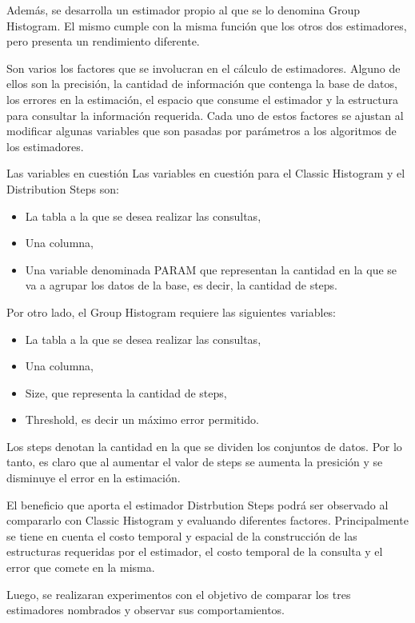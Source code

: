 \documentclass[10pt, a4paper,english,spanish,hidelinks]{article}
\begin{document}
Además, se desarrolla un estimador propio al que se lo denomina Group Histogram. El mismo cumple con la misma función que los otros dos estimadores, pero presenta un rendimiento diferente. 

Son varios los factores que se involucran en el cálculo de estimadores. Alguno de ellos
son la precisión, la cantidad de información que contenga la base de datos, los errores
en la estimación, el espacio que consume el estimador y la estructura para consultar la
información requerida. Cada uno de estos factores se ajustan al modificar algunas variables
que son pasadas por parámetros a los algoritmos de los estimadores.

Las variables en cuestión Las variables en cuestión para el Classic Histogram y el Distribution Steps son:
\begin{itemize}
\item La tabla a la que se desea realizar las consultas,
\item Una columna,
\item Una variable denominada PARAM que representan la cantidad en la que se va a agrupar
los datos de la base, es decir, la cantidad de steps.
\end{itemize}


Por otro lado, el Group Histogram requiere las siguientes variables:
\begin{itemize}
	\item La tabla a la que se desea realizar las consultas,
	\item Una columna,
  	\item Size, que representa la cantidad de steps,
  	\item Threshold, es decir un máximo error permitido.
\end{itemize}

Los steps denotan la cantidad en la que se dividen los conjuntos de datos. Por lo tanto,
es claro que al aumentar el valor de steps se aumenta la presición y se disminuye el
error en la estimación.

El beneficio que aporta el estimador Distrbution Steps podrá ser observado al compararlo
con Classic Histogram y evaluando diferentes factores. Principalmente se tiene en cuenta
el costo temporal y espacial de la construcción de las estructuras requeridas por el
estimador, el costo temporal de la consulta y el error que comete en la misma.

Luego, se realizaran experimentos con el objetivo de comparar los tres estimadores nombrados y observar sus comportamientos. 
\newpage
\end{document}
